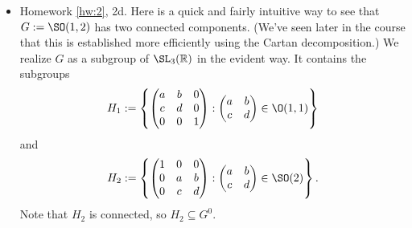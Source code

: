 \documentclass[reqno]{amsart} 
\begin{document}
\begin{itemize}
\item Homework \ref{hw:2}, 2d.
  Here is a quick and fairly intuitive way to see that $G := \SO(1,2)$
  has two connected components.
  (We've seen later in the course
  that this is established
  more efficiently using the Cartan decomposition.)
  We realize $G$ as a subgroup of $\SL_3(\mathbb{R})$
  in the evident way.
  It contains the subgroups
  \begin{equation*}
  H_1 :=
  \left\{
    \begin{pmatrix}
      a & b & 0 \\
      c & d & 0 \\
      0 & 0 & 1
    \end{pmatrix}
 :
    \begin{pmatrix}
      a & b \\
      c & d
    \end{pmatrix}
 \in \O(1,1)
  \right\}
  \end{equation*}
  and
  \begin{equation*}
  H_2 :=
  \left\{
    \begin{pmatrix}
      1 & 0 & 0 \\
      0 & a & b \\
      0 & c & d
    \end{pmatrix}
    :
    \begin{pmatrix}
      a & b \\
      c & d
    \end{pmatrix}
 \in \SO(2)
  \right\}.
  \end{equation*}
  Note that $H_2$ is connected,
  so $H_2 \subseteq G^0$.


\end{itemize}
\end{document}
